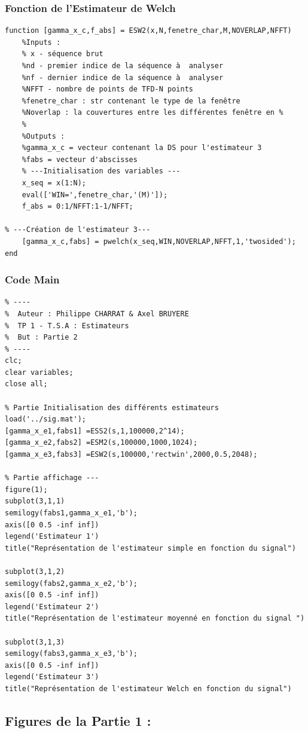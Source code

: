 \documentclass{article}
\begin{document}
\subsubsection{Fonction de l'Estimateur de Welch }
\begin{verbatim}
function [gamma_x_c,f_abs] = ESW2(x,N,fenetre_char,M,NOVERLAP,NFFT)
    %Inputs : 
    % x - séquence brut 
    %nd - premier indice de la séquence à  analyser
    %nf - dernier indice de la séquence à  analyser
    %NFFT - nombre de points de TFD-N points
    %fenetre_char : str contenant le type de la fenêtre
    %Noverlap : la couvertures entre les différentes fenêtre en % 
    %
    %Outputs : 
    %gamma_x_c = vecteur contenant la DS pour l'estimateur 3 
    %fabs = vecteur d'abscisses 
    % ---Initialisation des variables ---
    x_seq = x(1:N);
    eval(['WIN=',fenetre_char,'(M)']);
    f_abs = 0:1/NFFT:1-1/NFFT;
    
% ---Création de l'estimateur 3---
    [gamma_x_c,fabs] = pwelch(x_seq,WIN,NOVERLAP,NFFT,1,'twosided');  
end
\end{verbatim}
\newpage
\subsubsection{Code Main }
\begin{verbatim}
% ----
%  Auteur : Philippe CHARRAT & Axel BRUYERE
%  TP 1 - T.S.A : Estimateurs
%  But : Partie 2
% ----
clc;
clear variables;
close all;

% Partie Initialisation des différents estimateurs
load('../sig.mat');
[gamma_x_e1,fabs1] =ESS2(s,1,100000,2^14);
[gamma_x_e2,fabs2] =ESM2(s,100000,1000,1024);
[gamma_x_e3,fabs3] =ESW2(s,100000,'rectwin',2000,0.5,2048);
    
% Partie affichage ---
figure(1);
subplot(3,1,1)
semilogy(fabs1,gamma_x_e1,'b');
axis([0 0.5 -inf inf])
legend('Estimateur 1')
title("Représentation de l'estimateur simple en fonction du signal")

subplot(3,1,2)
semilogy(fabs2,gamma_x_e2,'b');
axis([0 0.5 -inf inf])
legend('Estimateur 2')
title("Représentation de l'estimateur moyenné en fonction du signal ")

subplot(3,1,3)
semilogy(fabs3,gamma_x_e3,'b');
axis([0 0.5 -inf inf])
legend('Estimateur 3')
title("Représentation de l'estimateur Welch en fonction du signal")
\end{verbatim}
\newpage
\subsection{Figures de la Partie 1 : }
\end{document}
